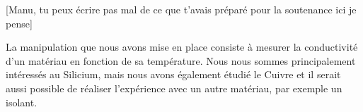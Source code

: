 [Manu, tu peux écrire pas mal de ce que t'avais préparé pour la soutenance ici je pense]

La manipulation que nous avons mise en place consiste à mesurer la conductivité d'un matériau en fonction de sa température. Nous nous sommes principalement intéressés au Silicium, mais nous avons également étudié le Cuivre et il serait aussi possible de réaliser l'expérience avec un autre matériau, par exemple un isolant.
